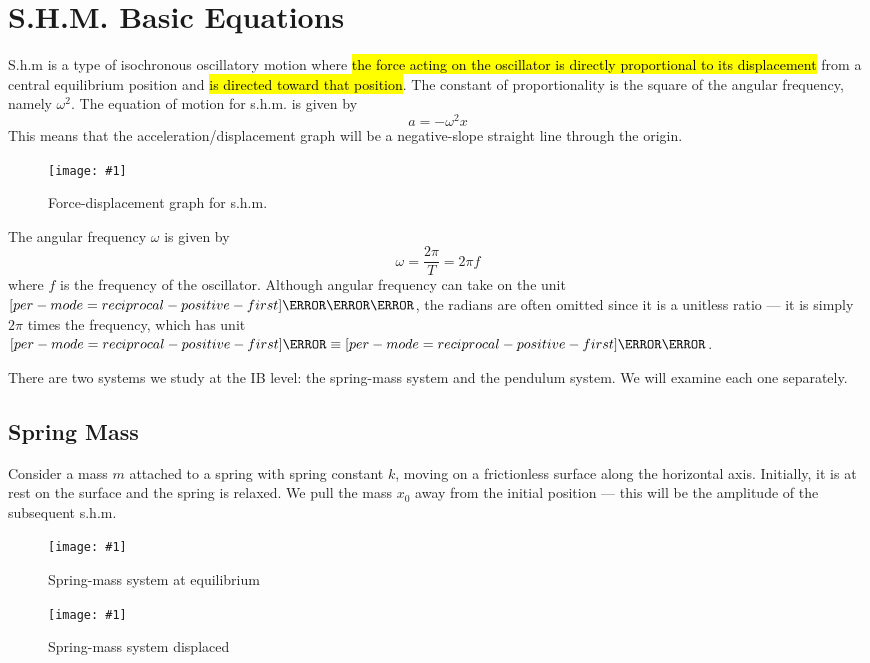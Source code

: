 \documentclass[a4paper,12pt]{article}
\let\oldsection\section
\renewcommand\section{\clearpage\oldsection}
\let\oldsi\si
\renewcommand{\si}[1]{\oldsi[per-mode=reciprocal-positive-first]{#1}}
\newcommand{\lb}{\\[8pt]}
\newcommand{\img}[4]{\begin{center}
  \begin{figure}[H]
    \centering
    \texttt{[image: \#1]}
    \caption{#3}
    \label{fig:#4}
  \end{figure}
\end{center}}
\begin{document}
\section{S.H.M. Basic Equations}

S.h.m is a type of isochronous oscillatory motion where \hl{the force acting on the oscillator is directly proportional to its displacement} from a central equilibrium position and \hl{is directed toward that position}. The constant of proportionality is the square of the angular frequency, namely $\omega^2$. The equation of motion for s.h.m. is given by
\begin{equation}
  a = -\omega^2 x
\end{equation}
This means that the acceleration/displacement graph will be a negative-slope straight line through the origin.
\img{shmrequirement.png}{0.4}{Force-displacement graph for s.h.m.}{shmrequirement}
The angular frequency $\omega$ is given by
$$\omega = \frac{2\pi}{T} = 2\pi f$$
where $f$ is the frequency of the oscillator. Although angular frequency can take on the unit $\si{\radian\per\second}$, the radians are often omitted since it is a unitless ratio --- it is simply $2\pi$ times the frequency, which has unit $\si{\hertz}\equiv \si{\per\s}$.

There are two systems we study at the IB level: the spring-mass system and the pendulum system. We will examine each one separately.

\pagebreak

\subsection{Spring Mass}

Consider a mass $m$ attached to a spring with spring constant $k$, moving on a frictionless surface along the horizontal axis. Initially, it is at rest on the surface and the spring is relaxed. We pull the mass $x_0$ away from the initial position --- this will be the amplitude of the subsequent s.h.m.

\hspace*{0.1\textwidth}
\begin{minipage}{0.3\textwidth}
  \img{springmass1.png}{1}{Spring-mass system at equilibrium}{springmass1}
\end{minipage}\hspace*{0.1\textwidth}%
\begin{minipage}{0.4\textwidth}
  \img{springmass2.png}{1}{Spring-mass system displaced}{springmass2}
\end{minipage}\hspace*{0.1\textwidth}\lb
\end{document}

